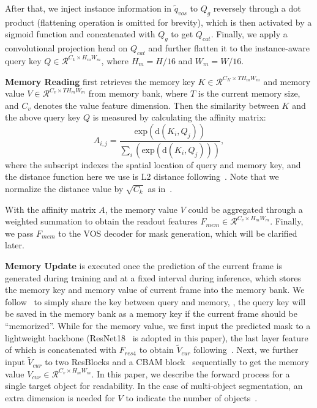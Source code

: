\documentclass[10pt,twocolumn,letterpaper]{article}
\begin{document}
After that, we inject instance information in $\tilde{q}_{vos}$ to $Q_{g}$ reversely through a dot product (flattening operation is omitted for brevity), which is then activated by a sigmoid function and concatenated with $Q_{g}$ to get $Q_{cat}$. Finally, we apply a convolutional projection head on $Q_{cat}$ and further flatten it to the instance-aware query key $Q \in \mathcal{R}^{C_{k} \times H_{m} W_{m}}$, where $H_{m} = H / 16$ and $W_{m} = W / 16$. 

\vspace{0.02in}
\noindent \textbf{Memory Reading} first retrieves the memory key $K \in \mathcal{R}^{C_{K} \times T H_{m} W_{m}}$ and memory value $V \in \mathcal{R}^{C_{v} \times T H_{m} W_{m}}$ from memory bank, where $T$ is the current memory size, and $C_{v}$ denotes the value feature dimension. Then the similarity between $K$ and the above query key $Q$ is measured by calculating the affinity matrix:
\begin{equation}
   A_{i,j} = \frac{\mathrm{exp}(\mathrm{d}(K_{i}, Q_{j}))}{\sum_{i}(\mathrm{exp}(\mathrm{d}(K_{i}, Q_{j})))},
\end{equation}
where the subscript indexes the spatial location of query and memory key, and the distance function here we use is L2 distance following~\cite{cheng2021stcn,cheng2022xmem}. Note that we normalize the distance value by $\sqrt{C_{k}}$ as in~\cite{oh2019video,cheng2021stcn}.

With the affinity matrix $A$, the memory value $V$ could be aggregated through a weighted summation to obtain the readout features $F_{mem} \in \mathcal{R}^{C_{v} \times H_{m} W_{m}}$. Finally, we pass $F_{mem}$ to the VOS decoder for mask generation, which will be clarified later.

\vspace{0.02in}
\noindent \textbf{Memory Update} is executed once the prediction of the current frame is generated  during training and at a fixed interval during inference, which stores the memory key and memory value of current frame into the memory bank. We follow~\cite{cheng2021stcn,cheng2022xmem} to simply share the key between query and memory, \ie, the query key will be saved in the memory bank as a memory key if the current frame should be ``memorized''. While for the memory value, we first input the predicted mask to a lightweight backbone (ResNet18~\cite{he2016deep} is adopted in this paper), the last layer feature of which is concatenated with $F_{res4}$ to obtain $\tilde{V}_{cur}$ following~\cite{cheng2021stcn,cheng2022xmem}. Next, we further input $\tilde{V}_{cur}$ to two ResBlocks and a CBAM block~\cite{woo2018cbam} sequentially to get the memory value $V_{cur} \in \mathcal{R}^{C_{v} \times H_{m} W_{m}}$. In this paper, we describe the forward process for a single target object for readability. In the case of multi-object segmentation, an extra dimension is needed for $V$ to indicate the number of objects~\cite{cheng2021stcn}.
\end{document}
